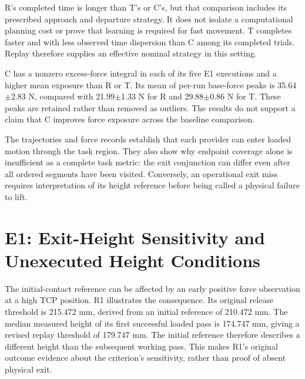 
R's completed time is longer than T's or C's, but that comparison includes its prescribed approach and departure strategy. It does not isolate a computational planning cost or prove that learning is required for fast movement. T completes faster and with less observed time dispersion than C among its completed trials. Replay therefore supplies an effective nominal strategy in this setting.

C has a nonzero excess-force integral in each of its five E1 executions and a higher mean exposure than R or T. Its mean of per-run base-force peaks is 35.64\(\pm\)2.83 N, compared with 21.99\(\pm\)1.33 N for R and 29.88\(\pm\)0.86 N for T. These peaks are retained rather than removed as outliers. The results do not support a claim that C improves force exposure across the baseline comparison.



The trajectories and force records establish that each provider can enter loaded motion through the task region. They also show why endpoint coverage alone is insufficient as a complete task metric: the exit conjunction can differ even after all ordered segments have been visited. Conversely, an operational exit miss requires interpretation of its height reference before being called a physical failure to lift.

\section{E1: Exit-Height Sensitivity and Unexecuted Height Conditions}
The initial-contact reference can be affected by an early positive force observation at a high TCP position. R1 illustrates the consequence. Its original release threshold is 215.472 mm, derived from an initial reference of 210.472 mm. The median measured height of its first successful loaded pass is 174.747 mm, giving a revised replay threshold of 179.747 mm. The initial reference therefore describes a different height than the subsequent working pass. This makes R1's original outcome evidence about the criterion's sensitivity, rather than proof of absent physical exit.

